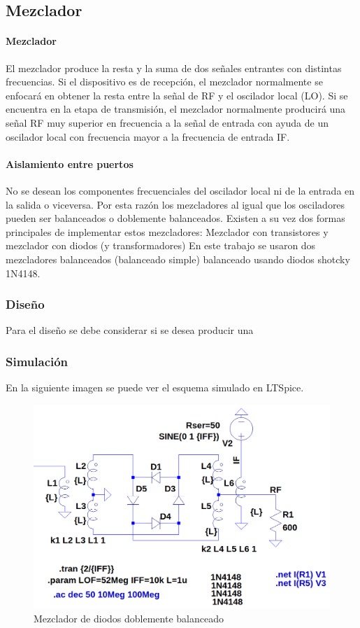 \subsection{Mezclador}
\paragraph{Mezclador}
El mezclador produce la resta y la suma de dos señales entrantes con distintas frecuencias. Si el dispositivo es de recepción, el mezclador normalmente se enfocará en obtener la resta entre la señal de RF y el oscilador local (LO). Si se encuentra en la etapa de transmisión, el mezclador normalmente producirá una señal RF muy superior en frecuencia a la señal de entrada con ayuda de un oscilador local con frecuencia mayor a la frecuencia de entrada IF.
\paragraph{Aislamiento entre puertos}
No se desean los componentes frecuenciales del oscilador local ni de la entrada en la salida o viceversa. Por esta razón los mezcladores al igual que los osciladores pueden ser balanceados o doblemente balanceados. Existen a su vez dos formas principales de implementar estos mezcladores: Mezclador con transistores y mezclador con diodos (y transformadores) En este trabajo se usaron dos mezcladores balanceados (balanceado simple) balanceado usando diodos shotcky 1N4148. 
\subsubsection{Diseño}
Para el diseño se debe considerar si se desea producir una 
\subsubsection{Simulación}
En la siguiente imagen se puede ver el esquema simulado en LTSpice. 
\begin{figure}
    \centering
    \includegraphics[width=0.5\linewidth]{Images/MIXERSIMU.png}
    \caption{Mezclador de diodos doblemente balanceado}
    \label{fig:mezDiod2}
\end{figure}